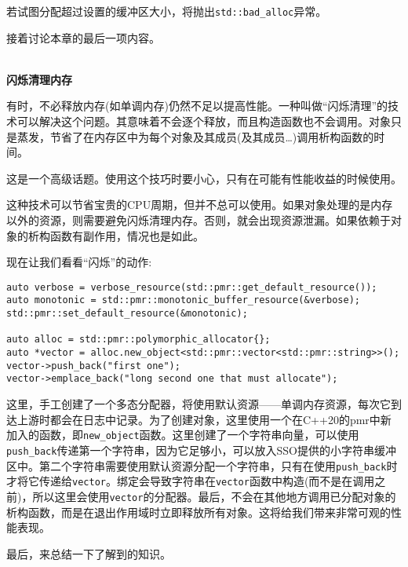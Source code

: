 若试图分配超过设置的缓冲区大小，将抛出\texttt{std::bad\_alloc}异常。

接着讨论本章的最后一项内容。

\hspace*{\fill} \\ %
\noindent
\textbf{闪烁清理内存}

有时，不必释放内存(如单调内存)仍然不足以提高性能。一种叫做“闪烁清理”的技术可以解决这个问题。其意味着不会逐个释放，而且构造函数也不会调用。对象只是蒸发，节省了在内存区中为每个对象及其成员(及其成员…)调用析构函数的时间。

\begin{tcolorbox}[colback=blue!5!white,colframe=blue!75!black, title=Note]
\hspace*{0.7cm}这是一个高级话题。使用这个技巧时要小心，只有在可能有性能收益的时候使用。
\end{tcolorbox}

这种技术可以节省宝贵的CPU周期，但并不总可以使用。如果对象处理的是内存以外的资源，则需要避免闪烁清理内存。否则，就会出现资源泄漏。如果依赖于对象的析构函数有副作用，情况也是如此。

现在让我们看看“闪烁”的动作:

\begin{lstlisting}[style=styleCXX]
auto verbose = verbose_resource(std::pmr::get_default_resource());
auto monotonic = std::pmr::monotonic_buffer_resource(&verbose);
std::pmr::set_default_resource(&monotonic);

auto alloc = std::pmr::polymorphic_allocator{};
auto *vector = alloc.new_object<std::pmr::vector<std::pmr::string>>();
vector->push_back("first one");
vector->emplace_back("long second one that must allocate");
\end{lstlisting}

这里，手工创建了一个多态分配器，将使用默认资源——单调内存资源，每次它到达上游时都会在日志中记录。为了创建对象，这里使用一个在C++20的pmr中新加入的函数，即\texttt{new\_object}函数。这里创建了一个字符串向量，可以使用\texttt{push\_back}传递第一个字符串，因为它足够小，可以放入SSO提供的小字符串缓冲区中。第二个字符串需要使用默认资源分配一个字符串，只有在使用\texttt{push\_back}时才将它传递给\texttt{vector}。绑定会导致字符串在\texttt{vector}函数中构造(而不是在调用之前)，所以这里会使用\texttt{vector}的分配器。最后，不会在其他地方调用已分配对象的析构函数，而是在退出作用域时立即释放所有对象。这将给我们带来非常可观的性能表现。

最后，来总结一下了解到的知识。














 